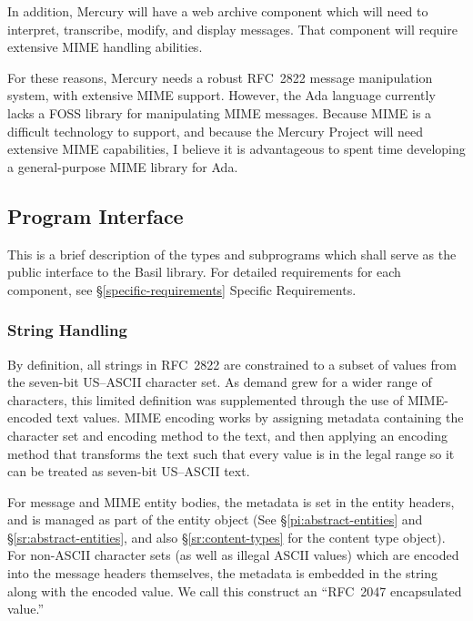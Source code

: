 \documentclass[11pt]{article}
\begin{document}
In addition, Mercury will have a web archive component which will need
to interpret, transcribe, modify, and display messages. That component
will require extensive MIME handling abilities.

For these reasons, Mercury needs a robust RFC~2822 message
manipulation system, with extensive MIME support. However, the Ada
language currently lacks a FOSS library for manipulating MIME
messages. Because MIME is a difficult technology to support, and
because the Mercury Project will need extensive MIME capabilities, I
believe it is advantageous to spent time developing a general-purpose
MIME library for Ada.


\subsection{Program Interface}

This is a brief description of the types and subprograms which shall
serve as the public interface to the Basil library. For detailed
requirements for each component, see \S\ref{specific-requirements}
Specific Requirements.

\subsubsection{String Handling}
\label{pi:strings}

By definition, all strings in RFC~2822 are constrained to a
subset of values from the seven-bit US--ASCII character set. As demand
grew for a wider range of characters, this limited definition was
supplemented through the use of MIME-encoded text values. MIME
encoding works by assigning metadata containing the character set and
encoding method to the text, and then applying an encoding method that
transforms the text such that every value is in the legal range so it
can be treated as seven-bit US--ASCII text.

For message and MIME entity bodies, the metadata is set in the entity
headers, and is managed as part of the entity object (See
\S\ref{pi:abstract-entities} and \S\ref{sr:abstract-entities}, and
also \S\ref{sr:content-types} for the content type object). For
non-ASCII character sets (as well as illegal ASCII values) which are
encoded into the message headers themselves, the metadata is embedded
in the string along with the encoded value. We call this construct an
``RFC~2047 encapsulated value.''
\end{document}
